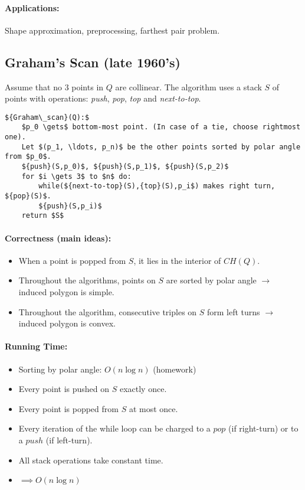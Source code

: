 \paragraph{Applications:} Shape approximation, preprocessing, farthest pair problem.

\subsection{Graham's Scan (late 1960's)}

Assume that no 3 points in $Q$ are collinear.
The algorithm uses a stack $S$ of points with operations: \emph{push}, \emph{pop}, \emph{top} and \emph{next-to-top}.

\begin{lstlisting}[mathescape]
${Graham\_scan}(Q):$
	$p_0 \gets$ bottom-most point. (In case of a tie, choose rightmost one).
	Let $(p_1, \ldots, p_n)$ be the other points sorted by polar angle from $p_0$.
	${push}(S,p_0)$, ${push}(S,p_1)$, ${push}(S,p_2)$
	for $i \gets 3$ to $n$ do:
		while(${next-to-top}(S),{top}(S),p_i$) makes right turn, ${pop}(S)$.
		${push}(S,p_i)$
	return $S$
\end{lstlisting}

\paragraph{Correctness (main ideas):}
\begin{itemize}
	\item When a point is popped from $S$, it lies in the interior of ${CH}(Q)$.
	\item Throughout the algorithms, points on $S$ are sorted by polar angle $\rightarrow$ induced polygon is simple.
	\item Throughout the algorithm, consecutive triples on $S$ form left turns $\rightarrow$ induced polygon is convex.
\end{itemize}

\paragraph{Running Time:}
\begin{itemize}
\item Sorting by polar angle: $O(n \log n)$ (homework)
\item Every point is pushed on $S$ exactly once.
\item Every point is popped from $S$ at most once.
\item Every iteration of the while loop can be charged to a ${pop}$ (if right-turn) or to a ${push}$ (if left-turn).
\item All stack operations take constant time.
\item $\implies O(n \log n)$
\end{itemize}

